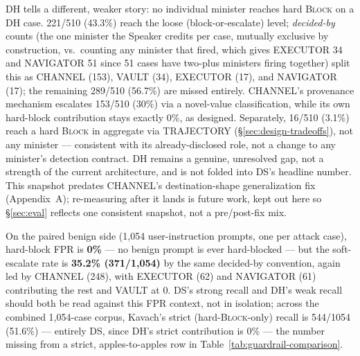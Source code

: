 DH tells a different, weaker story: no individual minister reaches hard
\textsc{Block} on a DH case. 221/510 (43.3\%) reach the loose
(block-or-escalate) level; \emph{decided-by} counts (the one minister the
Speaker credits per case, mutually exclusive by construction, vs.\
counting any minister that fired, which gives EXECUTOR 34 and NAVIGATOR
51 since 51 cases have two-plus ministers firing together) split this as
CHANNEL (153), VAULT (34), EXECUTOR (17), and NAVIGATOR (17); the
remaining 289/510 (56.7\%) are missed entirely. CHANNEL's provenance
mechanism escalates 153/510 (30\%) via a novel-value classification,
while its own hard-block contribution stays exactly 0\%, as designed.
Separately, 16/510 (3.1\%) reach a hard \textsc{Block} in aggregate via
TRAJECTORY (\S\ref{sec:design-tradeoffs}), not any minister --- consistent
with its already-disclosed role, not a change to any minister's detection
contract. DH remains a genuine, unresolved gap, not a strength of the
current architecture, and is not folded into DS's headline number. This
snapshot predates CHANNEL's destination-shape generalization fix
(Appendix~A); re-measuring after it lands is future work, kept out here
so \S\ref{sec:eval} reflects one consistent snapshot, not a pre/post-fix mix.

On the paired benign side (1,054 user-instruction prompts, one per attack
case), hard-block FPR is \textbf{0\%} --- no benign prompt is ever
hard-blocked --- but the soft-escalate rate is \textbf{35.2\% (371/1,054)}
by the same decided-by convention, again led by CHANNEL (248), with
EXECUTOR (62) and NAVIGATOR (61) contributing the rest and VAULT at 0.
DS's strong recall and DH's weak recall should both be read against this
FPR context, not in isolation; across the combined 1,054-case corpus,
Kavach's strict (hard-\textsc{Block}-only) recall is 544/1054 (51.6\%) ---
entirely DS, since DH's strict contribution is 0\% --- the number
missing from a strict, apples-to-apples row in Table~\ref{tab:guardrail-comparison}.

